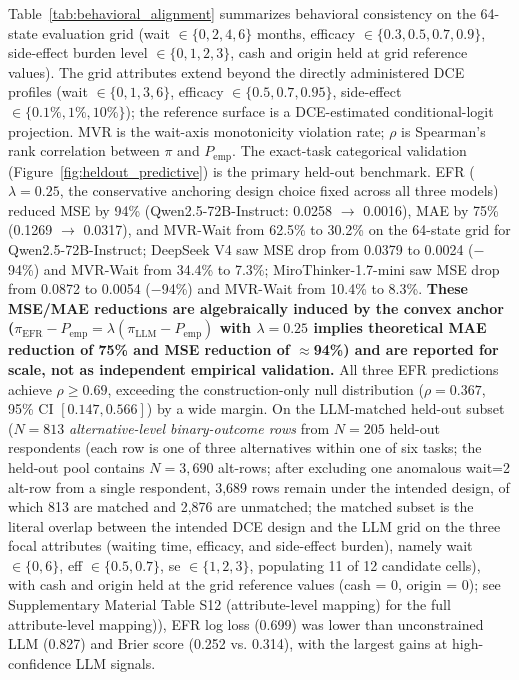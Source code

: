 \documentclass[11pt]{article}
\begin{document}
Table~\ref{tab:behavioral_alignment} summarizes behavioral consistency on the 64-state evaluation grid (wait $\in \{0, 2, 4, 6\}$ months, efficacy $\in \{0.3, 0.5, 0.7, 0.9\}$, side-effect burden level $\in \{0, 1, 2, 3\}$, cash and origin held at grid reference values). The grid attributes extend beyond the directly administered DCE profiles (wait $\in \{0, 1, 3, 6\}$, efficacy $\in \{0.5, 0.7, 0.95\}$, side-effect $\in \{0.1\%, 1\%, 10\%\}$); the reference surface is a DCE-estimated conditional-logit projection. MVR is the wait-axis monotonicity violation rate; $\rho$ is Spearman's rank correlation between $\pi$ and $P_{\text{emp}}$. The exact-task categorical validation (Figure~\ref{fig:heldout_predictive}) is the primary held-out benchmark. EFR ($\lambda = 0.25$, the conservative anchoring design choice fixed across all three models) reduced MSE by 94\% (Qwen2.5-72B-Instruct: 0.0258 $\to$ 0.0016), MAE by 75\% (0.1269 $\to$ 0.0317), and MVR-Wait from 62.5\% to 30.2\% on the 64-state grid for Qwen2.5-72B-Instruct; DeepSeek V4 saw MSE drop from 0.0379 to 0.0024 ($-$94\%) and MVR-Wait from 34.4\% to 7.3\%; MiroThinker-1.7-mini saw MSE drop from 0.0872 to 0.0054 ($-$94\%) and MVR-Wait from 10.4\% to 8.3\%. \textbf{These MSE/MAE reductions are algebraically induced by the convex anchor ($\pi_{\text{EFR}} - P_{\text{emp}} = \lambda(\pi_{\text{LLM}} - P_{\text{emp}})$ with $\lambda = 0.25$ implies theoretical MAE reduction of 75\% and MSE reduction of $\approx$94\%) and are reported for scale, not as independent empirical validation.} All three EFR predictions achieve $\rho \geq 0.69$, exceeding the construction-only null distribution ($\rho = 0.367$, 95\% CI $[0.147, 0.566]$) by a wide margin. On the LLM-matched held-out subset ($N=813$ \emph{alternative-level binary-outcome rows} from $N=205$ held-out respondents (each row is one of three alternatives within one of six tasks; the held-out pool contains $N=3{,}690$ alt-rows; after excluding one anomalous wait=2 alt-row from a single respondent, 3{,}689 rows remain under the intended design, of which 813 are matched and 2{,}876 are unmatched; the matched subset is the literal overlap between the intended DCE design and the LLM grid on the three focal attributes (waiting time, efficacy, and side-effect burden), namely wait $\in \{0, 6\}$, eff $\in \{0.5, 0.7\}$, se $\in \{1, 2, 3\}$, populating 11 of 12 candidate cells), with cash and origin held at the grid reference values (cash = 0, origin = 0); see Supplementary Material Table S12 (attribute-level mapping) for the full attribute-level mapping)), EFR log loss (0.699) was lower than unconstrained LLM (0.827) and Brier score (0.252 vs. 0.314), with the largest gains at high-confidence LLM signals.
\end{document}

